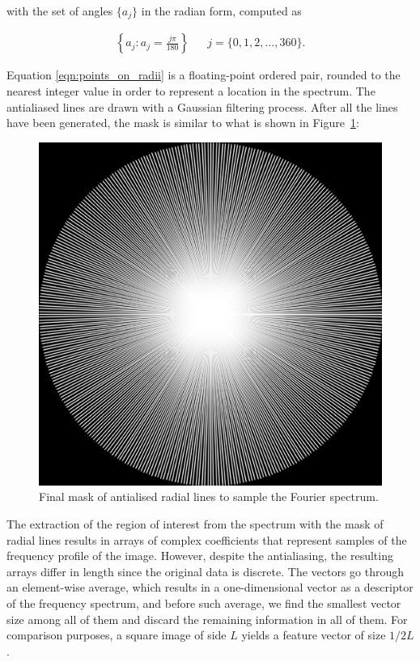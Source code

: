 \noindent with the set of angles $\{a_{j}\}$ in the radian form, computed as

\begin{align}
\label{eqn:angles}
\left\{
a_{j} : a_{j} = 
\frac{j \pi}{180}
\right\}
&&  j = \{0,1,2,...,360\}.
\end{align}

Equation
\ref{eqn:points_on_radii} is a
floating-point ordered pair, rounded to the nearest integer value in order to represent a location in the spectrum. The
antialiased lines are drawn with a Gaussian filtering process. After all the lines have been generated, the mask is similar to what is shown in Figure~\ref{fig:radial_masks}:

\begin{figure}[htb]
	\centering
	\caption{Final mask of antialised radial lines to sample the Fourier spectrum.}
	\label{fig:radial_masks}
	\includegraphics[scale=0.6]{images/radial_masks.png}
	\centering
	\fautor
\end{figure}

The extraction of the region of interest from the spectrum with the mask of radial lines results in arrays of complex coefficients that represent samples of the frequency profile of the image. However, despite the antialiasing, the resulting arrays differ in length since the original data is discrete. The vectors go through an element-wise average, which results in a one-dimensional vector as a descriptor of the frequency spectrum, and before such average, we find the smallest vector size among all of them and discard the remaining information in all of them. For comparison purposes, a square image of side $L$ yields a feature vector of size $1 / 2L$.

